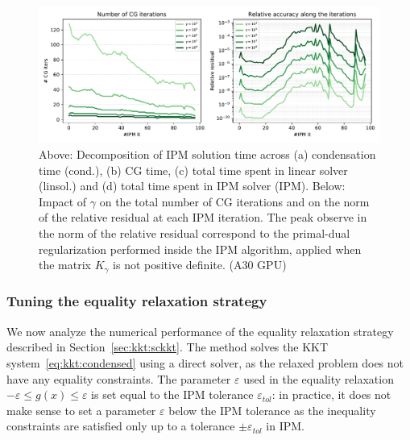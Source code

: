 \begin{figure}[!ht]
  \centering
  \includegraphics[width=\textwidth]{../figures/hybrid-gamma.pdf}
  \caption{
    Above: Decomposition of IPM solution time across
    (a) condensation time (cond.), (b) CG time, (c) total time
    spent in linear solver (linsol.) and (d) total time spent in
    IPM solver (IPM).
    Below: Impact of $\gamma$ on the total number of CG iterations
    and on the norm of the relative residual at each IPM iteration.
    The peak observe in the norm of the relative residual correspond
    to the primal-dual regularization performed inside the IPM algorithm,
    applied when the matrix $K_\gamma$ is not positive definite.
    \label{fig:hybrid:gamma}
    (A30 GPU)
  }
\end{figure}


\subsubsection{Tuning the equality relaxation strategy}
We now analyze the numerical performance of the equality relaxation strategy described in
Section~\ref{sec:kkt:sckkt}. The method solves the KKT system~\eqref{eq:kkt:condensed}
using a direct solver, as the relaxed problem does not have any equality constraints.
The parameter $\varepsilon$ used in the equality relaxation $-\varepsilon \leq g(x) \leq \varepsilon$
is set equal to the IPM tolerance $\varepsilon_{tol}$: in practice, it does not
make sense to set a parameter $\varepsilon$ below the IPM tolerance as the
inequality constraints are satisfied only up to a tolerance $\pm \varepsilon_{tol}$
in IPM.

